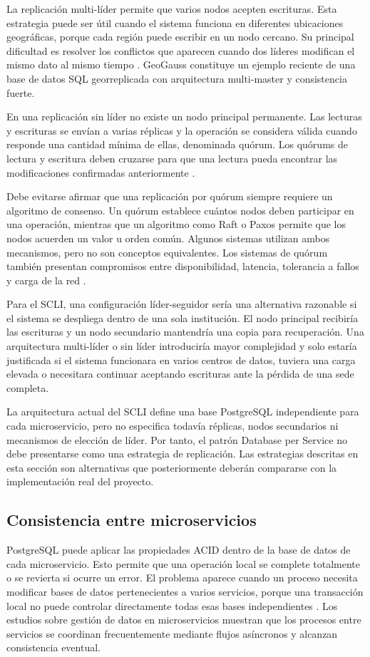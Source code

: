 \documentclass[conference]{IEEEtran}
\begin{document}
La replicación multi-líder permite que varios nodos acepten escrituras. Esta estrategia puede ser útil cuando el sistema funciona en diferentes ubicaciones geográficas, porque cada región puede escribir en un nodo cercano. Su principal dificultad es resolver los conflictos que aparecen cuando dos líderes modifican el mismo dato al mismo tiempo \cite{ref5}. GeoGauss constituye un ejemplo reciente de una base de datos SQL georreplicada con arquitectura multi-master y consistencia fuerte.

En una replicación sin líder no existe un nodo principal permanente. Las lecturas y escrituras se envían a varias réplicas y la operación se considera válida cuando responde una cantidad mínima de ellas, denominada quórum. Los quórums de lectura y escritura deben cruzarse para que una lectura pueda encontrar las modificaciones confirmadas anteriormente \cite{ref11}.

Debe evitarse afirmar que una replicación por quórum siempre requiere un algoritmo de consenso. Un quórum establece cuántos nodos deben participar en una operación, mientras que un algoritmo como Raft o Paxos permite que los nodos acuerden un valor u orden común. Algunos sistemas utilizan ambos mecanismos, pero no son conceptos equivalentes. Los sistemas de quórum también presentan compromisos entre disponibilidad, latencia, tolerancia a fallos y carga de la red \cite{ref11}.

Para el SCLI, una configuración líder-seguidor sería una alternativa razonable si el sistema se despliega dentro de una sola institución. El nodo principal recibiría las escrituras y un nodo secundario mantendría una copia para recuperación. Una arquitectura multi-líder o sin líder introduciría mayor complejidad y solo estaría justificada si el sistema funcionara en varios centros de datos, tuviera una carga elevada o necesitara continuar aceptando escrituras ante la pérdida de una sede completa.

La arquitectura actual del SCLI define una base PostgreSQL independiente para cada microservicio, pero no especifica todavía réplicas, nodos secundarios ni mecanismos de elección de líder. Por tanto, el patrón Database per Service no debe presentarse como una estrategia de replicación. Las estrategias descritas en esta sección son alternativas que posteriormente deberán compararse con la implementación real del proyecto.

\subsection{Consistencia entre microservicios}
PostgreSQL puede aplicar las propiedades ACID dentro de la base de datos de cada microservicio. Esto permite que una operación local se complete totalmente o se revierta si ocurre un error. El problema aparece cuando un proceso necesita modificar bases de datos pertenecientes a varios servicios, porque una transacción local no puede controlar directamente todas esas bases independientes \cite{ref2,ref6}. Los estudios sobre gestión de datos en microservicios muestran que los procesos entre servicios se coordinan frecuentemente mediante flujos asíncronos y alcanzan consistencia eventual.
\end{document}

